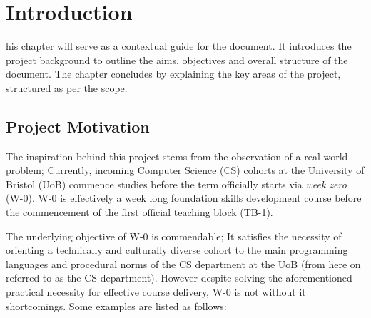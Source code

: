 %
%
\let\textcircled=\pgftextcircled
\chapter{Introduction}
\label{chap:intro}

his chapter will serve as a contextual guide for the document. It introduces the project background to outline the aims, objectives and overall structure of the document. The chapter concludes by explaining the key areas of the project, structured as per the scope.


\section{Project Motivation}
\label{sec1:sec01}


The inspiration behind this project stems from the observation of a real world problem; Currently, incoming Computer Science (CS) cohorts at the University of Bristol (UoB) commence studies before the term officially starts via \textit{week zero} (W-0). W-0 is effectively a week long foundation skills development course before the commencement of the first official teaching block (TB-1).

The underlying objective of W-0 is commendable; It satisfies the necessity of orienting a technically and culturally diverse cohort to the main programming languages and procedural norms of the CS department at the UoB (from here on referred to as the CS department). However despite solving the aforementioned practical necessity for effective course delivery, W-0 is not without it shortcomings. Some examples are listed as follows:

